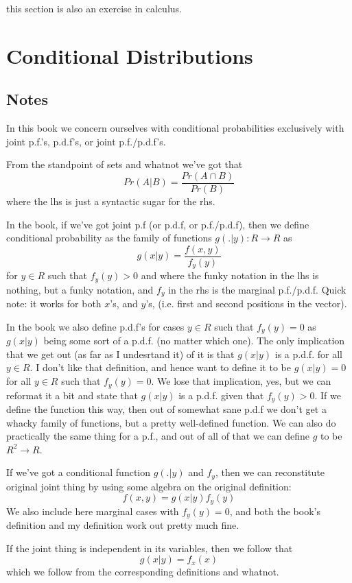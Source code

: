 \documentclass[11pt,oneside,titlepage]{book}
\begin{document}
this section is also an exercise in calculus.

\section{Conditional Distributions}

\subsection*{Notes}

In this book we concern ourselves with conditional probabilities
exclusively with joint p.f.'s, p.d.f's, or joint p.f./p.d.f's.

From the standpoint of sets and whatnot we've got that
$$Pr(A | B) = \frac{Pr(A \cap B)}{Pr(B)}$$
where the lhs is just a syntactic sugar for the rhs.

In the book, if we've got joint p.f (or p.d.f, or p.f./p.d.f), then we
define conditional probability as the family of functions
$g(.|y): R \to R$ as
$$g(x|y) = \frac{f(x, y)}{f_y(y)}$$
for $y \in R$ such that $f_y(y) > 0$ and 
where the funky notation in the lhs is nothing, but a funky notation,
and $f_y$ in the rhs is the marginal p.f./p.d.f. Quick note: it works for
both $x$'s, and $y$'s, (i.e. first and second positions in the vector).

In the book we also define p.d.f's for cases $y \in R$ such that
$f_y(y) = 0$ as $g(x|y)$ being some sort of a p.d.f. (no matter which
one).  The only implication that we get out (as far as I undesrtand
it) of it is that $g(x|y)$ is a p.d.f. for all $y \in R$. I don't like
that definition, and hence want to define it to be $g(x|y) = 0$ for
all $y \in R$ such that $f_y(y) = 0$. We lose that implication, yes,
but we can reformat it a bit and state that $g(x|y)$ is a p.d.f. given
that $f_y(y) > 0$. If we define the function this way, then out of
somewhat sane p.d.f we don't get a whacky family of functions, but a
pretty well-defined function. We can also do practically the same thing
for a p.f., and out of all of that we can define $g$ to be $R^2 \to R$. 

If we've got a conditional function $g(.|y)$ and $f_y$, then we
can reconstitute original joint thing by using some algebra on the original
definition:
$$f(x, y) = g(x|y) f_y(y)$$
We also include here marginal cases with $f_y(y) = 0$, and both the book's
definition and my definition work out pretty much fine.

If the joint thing is independent in its variables, then we follow that
$$g(x|y) = f_x(x)$$
which we follow from the corresponding definitions and whatnot.
\end{document}
